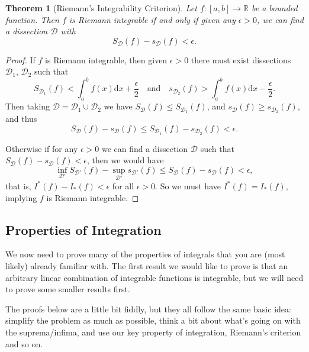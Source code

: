 \documentclass[11pt, a4paper]{article}
\newtheorem{theorem}{Theorem}[section]
\theoremstyle{definition}
\newcommand{\R}{\mathbb{R}}
\newcommand{\DD}{\mathcal{D}}
\newcommand{\dd}{\mathrm{d}}
\begin{document}
\begin{theorem}[Riemann's Integrability Criterion]
	Let $f:[a, b] \rightarrow \R$ be a bounded function. Then $f$ is Riemann integrable if and only if given any $\epsilon>0$, we can find a dissection $\DD$ with
	$$
	S_\DD(f) - s_\DD(f) < \epsilon.
	$$
\end{theorem}
\begin{proof}
	If $f$ is Riemann integrable, then given $\epsilon > 0$ there must exist dissections $\DD_1$, $\DD_2$ such that
	$$
	S_{\DD_1}(f) < \int_a^b f(x) \dd x + \frac{\epsilon}{2} \quad \text{and} \quad s_{\DD_2}(f) > \int_a^b f(x) \dd x - \frac{\epsilon}{2}.
	$$
	Then taking $\DD = \DD_1 \cup \DD_2$ we have $S_{\DD}(f) \leq S_{\DD_1}(f)$, and $s_{\DD}(f) \geq s_{\DD_2}(f)$, and thus
	$$
	S_\DD(f) - s_\DD(f) \leq S_{\DD_1}(f) - s_{\DD_2}(f) < \epsilon.
	$$

	Otherwise if for any $\epsilon > 0$ we can find a dissection $\DD$ such that $S_{\DD}(f) - s_{\DD}(f) < \epsilon$, then we would have
	$$
	\inf_{\DD'} S_{\DD'}(f) - \sup_{\DD'} s_{\DD'}(f) \leq S_{\DD}(f) - s_{\DD}(f) < \epsilon,
	$$
	that is, $I^*(f) - I_*(f) < \epsilon$ for all $\epsilon > 0$. So we must have $I^*(f) = I_*(f)$, implying $f$ is Riemann integrable.
\end{proof}


\subsection{Properties of Integration}

We now need to prove many of the properties of integrals that you are (most likely) already familiar with. The first result we would like to prove is that an arbitrary linear combination of integrable functions is integrable, but we will need to prove some smaller results first.

The proofs below are a little bit fiddly, but they all follow the same basic idea: simplify the problem as much as possible, think a bit about what's going on with the suprema/infima, and use our key property of integration, Riemann's criterion and so on. 
\end{document}
